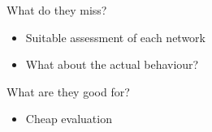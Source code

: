 \begin{frame}{What do they miss?}
  \begin{itemize}
    \item Suitable assessment of each network
    \item What about the actual behaviour?
  \end{itemize}
\end{frame}

\begin{frame}{What are they good for?}
  \begin{itemize}
    \item Cheap evaluation
  \end{itemize}
\end{frame}

